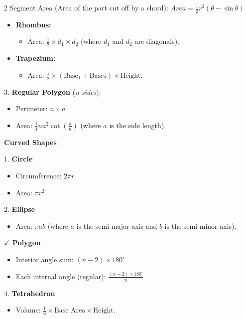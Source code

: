 \documentclass[10pt,a4paper]{article}
\begin{document}
\begin{paracol}{2}
Segment Area (Area of the part cut off by a chord): $Area = \frac{1}{2} r^2 (\theta - \sin\theta)$

\begin{itemize}
  \item \textbf{Rhombus:}
  \begin{itemize}
    \item Area: $\frac{1}{2} \times d_1 \times d_2$ (where $d_1$ and $d_2$ are diagonals).
  \end{itemize}
  \item \textbf{Trapezium:}
  \begin{itemize}
    \item Area: $\frac{1}{2} \times (\text{Base}_1 + \text{Base}_2) \times \text{Height}$.
  \end{itemize}
\end{itemize}
3. \textbf{Regular Polygon} (\textit{n sides}):
\begin{itemize}
  \item Perimeter: $n \times a$
  \item Area: $\frac{1}{4}na^2 \cot\!\left(\frac{\pi}{n}\right)$ (where $a$ is the side length).
\end{itemize}

\textbf{Curved Shapes}

1. \textbf{Circle}
\begin{itemize}
  \item Circumference: $2\pi r$
  \item Area: $\pi r^2$
\end{itemize}
2. \textbf{Ellipse}
\begin{itemize}
  \item Area: $\pi a b$ (where $a$ is the semi-major axis and $b$ is the semi-minor axis).
\end{itemize}

\textbf{$\checkmark$ Polygon}

\begin{itemize}
  \item Interior angle sum:
  $(n-2) \times 180^{\circ}$

  \item Each internal angle (regular):
  $\frac{(n-2)\times180^{\circ}}{n}$
\end{itemize}

4. \textbf{Tetrahedron}
\begin{itemize}
  \item Volume: $\frac{1}{6} \times \text{Base Area} \times \text{Height}$.
\end{itemize}


\end{paracol}
\end{document}
